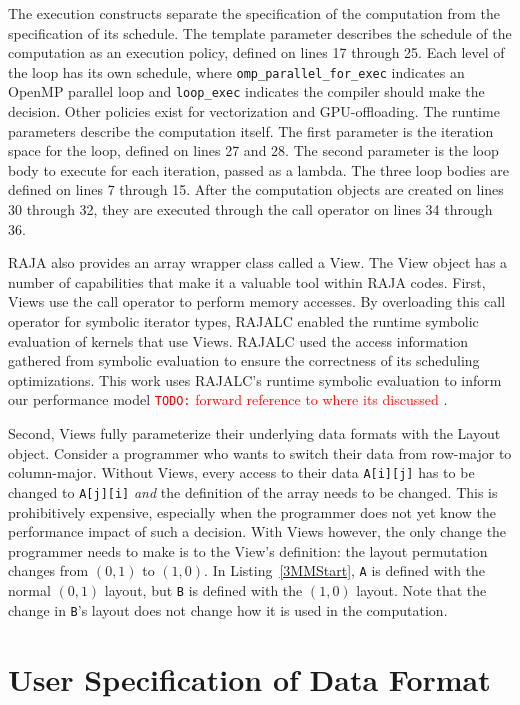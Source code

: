 \documentclass[sigconf, table]{acmart}
\newcommand{\todo}[1]{{\textcolor{red}{{\tt{TODO:}}\,\,#1 }}}
\begin{document}
The execution constructs separate the specification of the computation from the specification of its schedule.
The template parameter describes the schedule of the computation as an execution policy, defined on lines 17 through 25.
Each level of the loop has its own schedule, where \verb.omp_parallel_for_exec. indicates an OpenMP parallel loop and \verb.loop_exec. indicates the compiler should make the decision.
Other policies exist for vectorization and GPU-offloading.
The runtime parameters describe the computation itself. 
The first parameter is the iteration space for the loop, defined on lines 27 and 28. 
The second parameter is the loop body to execute for each iteration, passed as a lambda.
The three loop bodies are defined on lines 7 through 15.
After the computation objects are created on lines 30 through 32, they are executed through the call operator on lines 34 through 36.

RAJA also provides an array wrapper class called a View.
The View object has a number of capabilities that make it a valuable tool within RAJA codes.
First, Views use the call operator to perform memory accesses. 
By overloading this call operator for symbolic iterator types, RAJALC enabled the runtime symbolic evaluation of kernels that use Views.
RAJALC used the access information gathered from symbolic evaluation to ensure the correctness of its scheduling optimizations.
This work uses RAJALC's runtime symbolic evaluation to inform our performance model \todo{forward reference to where its discussed}.

Second, Views fully parameterize their underlying data formats with the Layout object.
Consider a programmer who wants to switch their data from row-major to column-major. 
Without Views, every access to their data \verb.A[i][j]. has to be changed to \verb.A[j][i]. \textit{and} the definition of the array needs to be changed. 
This is prohibitively expensive, especially when the programmer does not yet know the performance impact of such a decision.
With Views however, the only change the programmer needs to make is to the View's definition: the layout permutation changes from $(0,1)$ to $(1,0)$. 
In Listing~\ref{3MMStart}, \verb.A. is defined with the normal $(0,1)$ layout, but \verb.B. is defined with the $(1,0)$ layout. 
Note that the change in \verb.B.'s layout does not change how it is used in the computation. 




\section{User Specification of Data Format}
\end{document}
